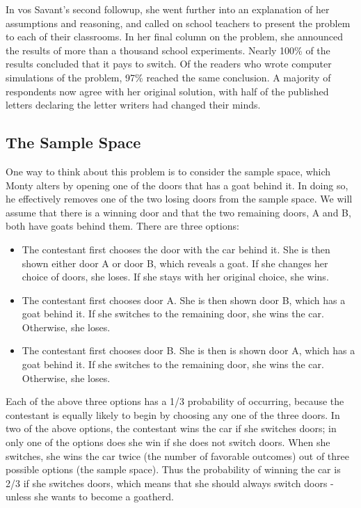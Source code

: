 \documentclass[11pt]{article} %
\begin{document}
In vos Savant's second followup, she went further into an explanation of her assumptions and reasoning, and called on school teachers to present the problem to each of their classrooms. In her final column on the problem, she announced the results of more than a thousand school experiments. Nearly 100\% of the results concluded that it pays to switch. Of the readers who wrote computer simulations of the problem, 97\% reached the same conclusion. A majority of respondents now agree with her original solution, with half of the published letters declaring the letter writers had changed their minds.

\subsection{The Sample Space}
One way to think about this problem is to consider the sample space, which Monty alters by opening one of the doors that has a goat behind it. In doing so, he effectively removes one of the two losing doors from the sample space.
We will assume that there is a winning door and that the two remaining doors, A and B, both have goats behind them. There are three options:

\begin{itemize}
\item The contestant first chooses the door with the car behind it. She is then shown either door A or door B, which reveals a goat. If she changes her choice of doors, she loses. If she stays with her original choice, she wins.

\item The contestant first chooses door A. She is then shown door B, which has a goat behind it. If she switches to the remaining door, she wins the car. Otherwise, she loses.
\item The contestant first chooses door B. She is then is shown door A, which has a goat behind it. If she switches to the remaining door, she wins the car. Otherwise, she loses.
\end{itemize}
Each of the above three options has a 1/3 probability of occurring, because the contestant is equally likely to begin by choosing any one of the three doors. In two of the above options, the contestant wins the car if she switches doors; in only one of the options does she win if she does not switch doors. When she switches, she wins the car twice (the number of favorable outcomes) out of three possible options (the sample space). Thus the probability of winning the car is 2/3 if she switches doors, which means that she should always switch doors - unless she wants to become a goatherd.
\end{document}
